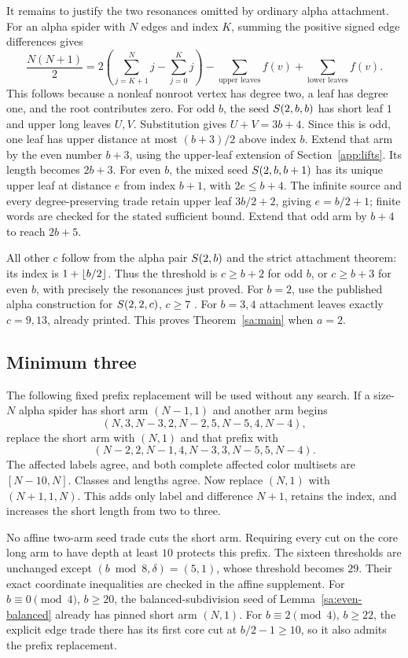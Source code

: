 It remains to justify the two resonances omitted by ordinary alpha attachment. For an alpha spider with $N$ edges and index $K$, summing the positive signed edge differences gives
\begin{equation}\label{sa:signed-leaves}
\frac{N(N+1)}2
=2\left(\sum_{j=K+1}^{N}j-\sum_{j=0}^{K}j\right)
-\sum_{\text{upper leaves}} f(v)+\sum_{\text{lower leaves}}f(v).
\end{equation}
This follows because a nonleaf nonroot vertex has degree two, a leaf has degree one, and the root contributes zero.
For odd $b$, the seed $S\!\left(2,b,b\right)$ has short leaf $1$ and upper long leaves $U,V$. Substitution gives $U+V=3b+4$. Since this is odd, one leaf has upper distance at most $(b+3)/2$ above index $b$. Extend that arm by the even number $b+3$, using the upper-leaf extension of Section~\ref{app:lifts}. Its length becomes $2b+3$.
For even $b$, the mixed seed $S\!\left(2,b,b+1\right)$ has its unique upper leaf at distance $e$ from index $b+1$, with $2e\le b+4$. The infinite source and every degree-preserving trade retain upper leaf $3b/2+2$, giving $e=b/2+1$; finite words are checked for the stated sufficient bound. Extend that odd arm by $b+4$ to reach $2b+5$.

All other $c$ follow from the alpha pair $S\!\left(2,b\right)$ and the strict attachment theorem: its index is $1+\left\lfloor b/2\right\rfloor$. Thus the threshold is $c\ge b+2$ for odd $b$, or $c\ge b+3$ for even $b$, with precisely the resonances just proved. For $b=2$, use the published alpha construction for $S\!\left(2,2,c\right)$, $c\ge7$ \cite[Lemma~3.6]{Panpa2025}. For $b=3,4$ attachment leaves exactly $c=9,13$, already printed. This proves Theorem~\ref{sa:main} when $a=2$.

\subsection{Minimum three}
The following fixed prefix replacement will be used without any search. If a size-$N$ alpha spider has short arm $(N-1,1)$ and another arm begins
\[
(N,3,N-3,2,N-2,5,N-5,4,N-4),
\]
replace the short arm with $(N,1)$ and that prefix with
\[
(N-2,2,N-1,4,N-3,3,N-5,5,N-4).
\]
The affected labels agree, and both complete affected color multisets are $[N-10,N]$. Classes and lengths agree. Now replace $(N,1)$ with $(N+1,1,N)$. This adds only label and difference $N+1$, retains the index, and increases the short length from two to three.

No affine two-arm seed trade cuts the short arm. Requiring every cut on the core long arm to have depth at least $10$ protects this prefix. The sixteen thresholds are unchanged except $(b\bmod8,\delta)=(5,1)$, whose threshold becomes $29$. Their exact coordinate inequalities are checked in the affine supplement. For $b\equiv0\pmod4$, $b\ge20$, the balanced-subdivision seed of Lemma~\ref{sa:even-balanced} already has pinned short arm $(N,1)$. For $b\equiv2\pmod4$, $b\ge22$, the explicit edge trade there has its first core cut at $b/2-1\ge10$, so it also admits the prefix replacement.

